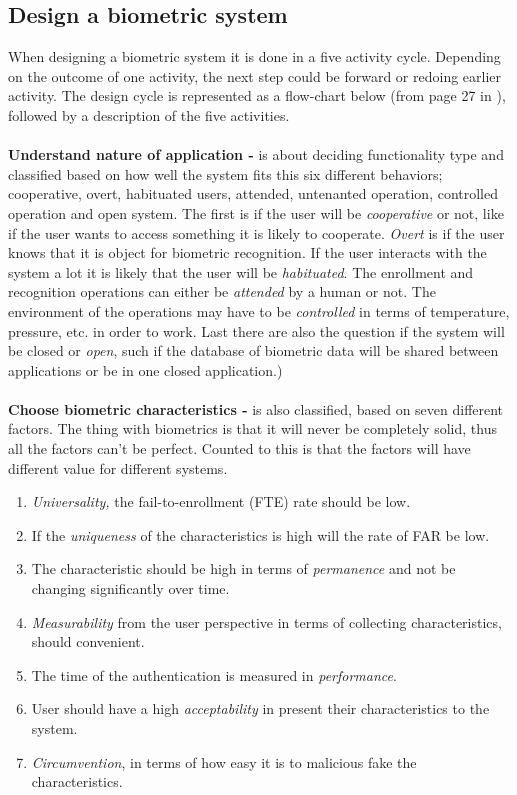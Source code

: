 \subsection{Design a biometric system}
When designing a biometric system it is done in a five activity cycle. Depending on the outcome of one activity, the next step could be forward or redoing earlier activity. The design cycle is represented as a flow-chart below (from page 27 in \cite[]{introbio}), followed by a description of the five activities. \\
\\
\textbf{Understand nature of application -} is about deciding functionality type and classified based on how well the system fits this six different behaviors; cooperative, overt, habituated users, attended, untenanted operation, controlled operation and open system. The first is if the user will be \textit{cooperative} or not, like if the user wants to access something it is likely to cooperate. \textit{Overt} is if the user knows that it is object for biometric recognition. If the user interacts with the system a lot it is likely that the user will be \textit{habituated}. The enrollment and recognition operations can either be \textit{attended} by a human or not. The environment of the operations may have to be \textit{controlled} in terms of temperature, pressure, etc. in order to work. Last there are also the question if the system will be closed or \textit{open}, such if the database of biometric data will be shared between applications or be in one closed application.) \\
\\
\textbf{Choose biometric characteristics -} is also classified, based on seven different factors. The thing with biometrics is that it will never be completely solid, thus all the factors can't be perfect. Counted to this is that the factors will have different value for different systems.
\begin{enumerate}
	\item \textit{Universality,} the fail-to-enrollment (FTE) rate should be low.
	\item If the \textit{uniqueness} of the characteristics is high will the rate of FAR be low. 
	\item The characteristic should be high in terms of \textit{permanence} and not be changing significantly over time.
	\item \textit{Measurability} from the user perspective in terms of collecting characteristics, should convenient.
	\item The time of the authentication is measured in \textit{performance}.
	\item User should have a high \textit{acceptability} in present their characteristics to the system.
	\item \textit{Circumvention}, in terms of how easy it is to malicious fake the characteristics.
\end{enumerate} 

